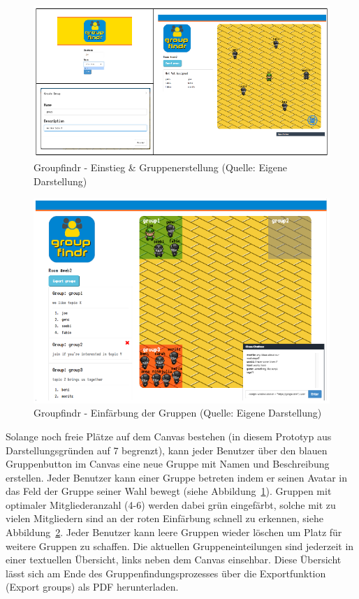 \begin{figure}[h]
\centering
\includegraphics{graphiken/groupfindr_einstieg-gruppenerstellung.png}
\caption{Groupfindr - Einstieg \& Gruppenerstellung (Quelle: Eigene Darstellung)}
\label{groupfindr_einstieg-gruppenerstellung}
\end{figure}


\begin{figure}[h]
\centering
\includegraphics{graphiken/groupfindr_einfaerbung-chat.png}
\caption{Groupfindr - Einfärbung der Gruppen (Quelle: Eigene Darstellung)}
\label{groupfindr_einfaerbung-chat}
\end{figure}

Solange noch freie Plätze auf dem Canvas bestehen (in diesem Prototyp aus Darstellungsgründen auf 7 begrenzt), kann jeder Benutzer über den blauen Gruppenbutton im Canvas eine neue Gruppe mit Namen und Beschreibung erstellen. Jeder Benutzer kann einer Gruppe betreten indem er seinen Avatar in das Feld der Gruppe seiner Wahl bewegt (siehe Abbildung~\ref{groupfindr_einstieg-gruppenerstellung}). Gruppen mit optimaler Mitgliederanzahl (4-6) werden dabei grün eingefärbt, solche mit zu vielen Mitgliedern sind an der roten Einfärbung schnell zu erkennen, siehe Abbildung~\ref{groupfindr_einfaerbung-chat}. Jeder Benutzer kann leere Gruppen wieder löschen um Platz für weitere Gruppen zu schaffen. Die aktuellen Gruppeneinteilungen sind jederzeit in einer textuellen Übersicht, links neben dem Canvas einsehbar. Diese Übersicht lässt sich am Ende des Gruppenfindungsprozesses über die Exportfunktion (Export groups) als PDF herunterladen.